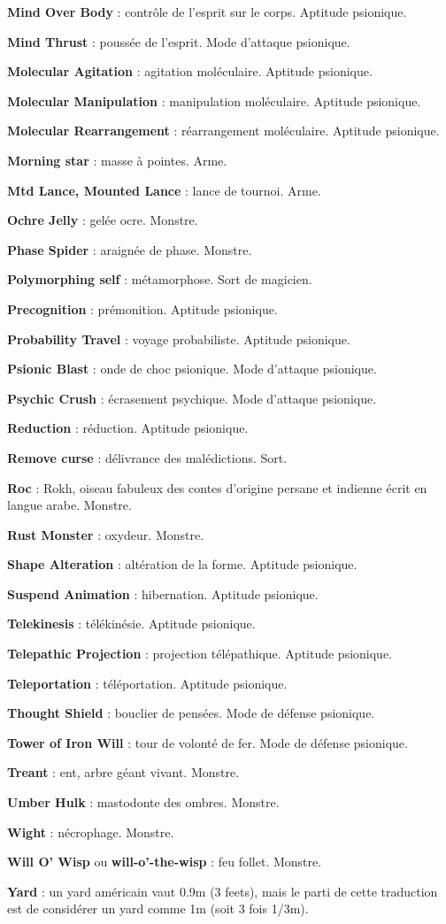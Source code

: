 \documentclass[11pt]{article}
\begin{document}
{\textbf{Mind Over Body} : contrôle de l'esprit sur le corps. Aptitude psionique.

\textbf{Mind Thrust} : poussée de l'esprit. Mode d'attaque psionique.

\textbf{Molecular Agitation} : agitation moléculaire. Aptitude psionique.

\textbf{Molecular Manipulation} : manipulation moléculaire. Aptitude psionique.

\textbf{Molecular Rearrangement} : réarrangement moléculaire. Aptitude psionique.

\textbf{Morning star} : masse à pointes. Arme.

\textbf{Mtd Lance, Mounted Lance} : lance de tournoi. Arme.

\textbf{Ochre Jelly} : gelée ocre. Monstre.

\textbf{Phase Spider} : araignée de phase. Monstre.

\textbf{Polymorphing self} : métamorphose. Sort de magicien.

\textbf{Precognition} : prémonition. Aptitude psionique.

\textbf{Probability Travel} : voyage probabiliste. Aptitude psionique.

\textbf{Psionic Blast} : onde de choc psionique. Mode d'attaque psionique.

\textbf{Psychic Crush} : écrasement psychique. Mode d'attaque psionique.

\textbf{Reduction} : réduction. Aptitude psionique.

\textbf{Remove curse} : délivrance des malédictions. Sort.

\textbf{Roc} : Rokh, oiseau fabuleux des contes d'origine persane et indienne écrit en langue arabe. Monstre.

\textbf{Rust Monster} : oxydeur. Monstre.

\textbf{Shape Alteration} : altération de la forme. Aptitude psionique.

\textbf{Suspend Animation} : hibernation. Aptitude psionique.

\textbf{Telekinesis} : télékinésie. Aptitude psionique.

\textbf{Telepathic Projection} : projection télépathique. Aptitude psionique.

\textbf{Teleportation} : téléportation. Aptitude psionique.

\textbf{Thought Shield} : bouclier de pensées. Mode de défense psionique.

\textbf{Tower of Iron Will} : tour de volonté de fer. Mode de défense psionique.

\textbf{Treant} : ent, arbre géant vivant. Monstre.

\textbf{Umber Hulk} : mastodonte des ombres. Monstre.

\textbf{Wight} : nécrophage. Monstre.

\textbf{Will O’ Wisp} ou \textbf{will-o'-the-wisp} : feu follet. Monstre.

\textbf{Yard} : un yard américain vaut 0.9m (3 feets), mais le parti de cette traduction est de considérer un yard comme 1m (soit 3 fois 1/3m).

}%
\end{document}
